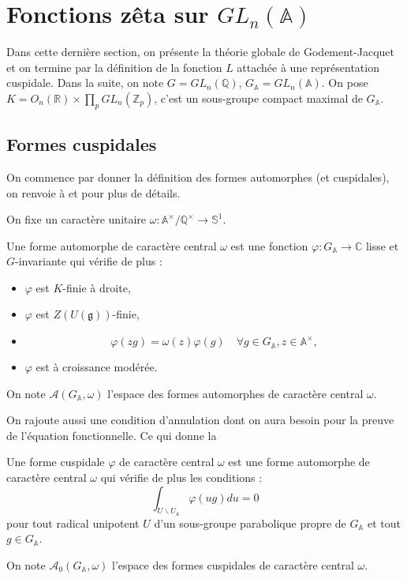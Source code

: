 \section{Fonctions zêta sur $GL_n(\mathbb{A})$}

Dans cette dernière section, on présente la théorie globale de Godement-Jacquet \cite{godement-jacquet} et on termine par la définition de la fonction $L$ attachée à une représentation cuspidale. Dans la suite, on note $G = GL_n(\mathbb{Q})$, $G_\mathbb{A}=GL_n(\mathbb{A})$. On pose $K = O_n(\mathbb{R}) \times \prod_p GL_n(\mathbb{Z}_p)$, c'est un sous-groupe compact maximal de $G_\mathbb{A}$.

\subsection{Formes cuspidales}
On commence par donner la définition des formes automorphes (et cuspidales), on renvoie à \cite{bump} et \cite{goldfeld-hundley} pour plus de détails.

On fixe un caractère unitaire $\omega : \mathbb{A}^\times/\mathbb{Q}^\times \rightarrow \mathbb{S}^1$.

\begin{definition}
Une forme automorphe de caractère central $\omega$ est une fonction $\varphi : G_\mathbb{A} \rightarrow \mathbb{C}$ lisse et $G$-invariante qui vérifie de plus :
\begin{itemize}
\item $\varphi$ est $K$-finie à droite,
\item $\varphi$ est $Z(U(\mathfrak{g}))$-finie,
\item \begin{equation}
\varphi(zg) = \omega(z)\varphi(g) \quad \forall g \in G_\mathbb{A}, z \in \mathbb{A}^\times,
\end{equation}
\item $\varphi$ est à croissance modérée.
\end{itemize}

On note $\mathcal{A}(G_\mathbb{A}, \omega)$ l'espace des formes automorphes de caractère central $\omega$.
\end{definition}

On rajoute aussi une condition d'annulation dont on aura besoin pour la preuve de l'équation fonctionnelle. Ce qui donne la
\begin{definition}
Une forme cuspidale $\varphi$ de caractère central $\omega$ est une forme automorphe de caractère central $\omega$ qui vérifie de plus les conditions :
\begin{equation}
\int_{U \backslash U_\mathbb{A}} \varphi(ug) du = 0
\end{equation}
pour tout radical unipotent $U$ d'un sous-groupe parabolique propre de $G_\mathbb{A}$ et tout $g \in G_\mathbb{A}$.

On note $\mathcal{A}_0(G_\mathbb{A}, \omega)$ l'espace des formes cuspidales de caractère central $\omega$.
\end{definition}

